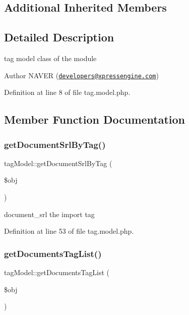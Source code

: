 \subsection*{Additional Inherited Members}


\subsection{Detailed Description}
tag model class of the module 

\begin{DoxyAuthor}{Author}
N\+A\+V\+ER (\href{mailto:developers@xpressengine.com}{\tt developers@xpressengine.\+com}) 
\end{DoxyAuthor}


Definition at line 8 of file tag.\+model.\+php.



\subsection{Member Function Documentation}
\mbox{\label{classtagModel_ae4ce7b3bc2314007c44c65375d089c13}} 
\subsubsection{\texorpdfstring{get\+Document\+Srl\+By\+Tag()}{getDocumentSrlByTag()}}
{\footnotesize\ttfamily tag\+Model\+::get\+Document\+Srl\+By\+Tag (\begin{DoxyParamCaption}\item[{}]{\$obj }\end{DoxyParamCaption})}



document\+\_\+srl the import tag 



Definition at line 53 of file tag.\+model.\+php.

\mbox{\label{classtagModel_a174355a0ae69966436ad4a30f2b134e1}} 
\subsubsection{\texorpdfstring{get\+Documents\+Tag\+List()}{getDocumentsTagList()}}
{\footnotesize\ttfamily tag\+Model\+::get\+Documents\+Tag\+List (\begin{DoxyParamCaption}\item[{}]{\$obj }\end{DoxyParamCaption})}



